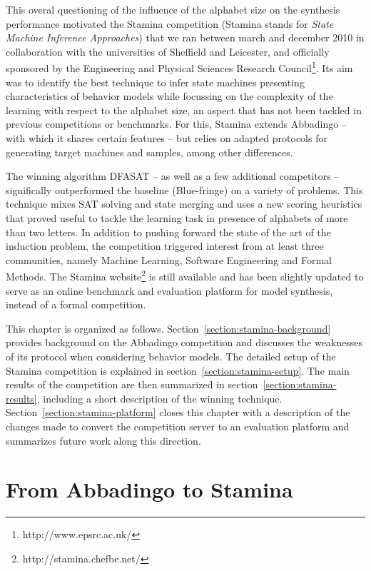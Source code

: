 This overal questioning of the influence of the alphabet size on the synthesis performance motivated the Stamina competition (Stamina stands for \emph{State Machine Inference Approaches}) that we ran between march and december 2010 in collaboration with the universities of Sheffield and Leicester, and officially sponsored by the Engineering and Physical Sciences Research Council\footnote{http://www.epsrc.ac.uk/}. Its aim was to identify the best technique to infer state machines presenting characteristics of behavior models while focussing on the complexity of the learning with respect to the alphabet size, an aspect that has not been tackled in previous competitions or benchmarks. For this, Stamina extends Abbadingo -- with which it shares certain features -- but relies on adapted protocols for generating target machines and samples, among other differences. 

The winning algorithm DFASAT -- as well as a few additional competitors -- significally outperformed the baseline (Blue-fringe) on a variety of problems. This technique mixes SAT solving and state merging and uses a new scoring heuristics that proved useful to tackle the learning task in presence of alphabets of more than two letters. In addition to pushing forward the state of the art of the induction problem, the competition triggered interest from at least three communities, namely Machine Learning, Software Engineering and Formal Methods. The Stamina website\footnote{http://stamina.chefbe.net/} is still available and has been slightly updated to serve as an online benchmark and evaluation platform for model synthesis, instead of a formal competition.

This chapter is organized as follows. Section~\ref{section:stamina-background} provides background on the Abbadingo competition and discusses the weaknesses of its protocol when considering behavior models. The detailed setup of the Stamina competition is explained in section~\ref{section:stamina-setup}. The main results of the competition are then summarized in section~\ref{section:stamina-results}, including a short description of the winning technique. Section~\ref{section:stamina-platform} closes this chapter with a description of the changes made to convert the competition server to an evaluation platform and summarizes future work along this direction.

\section{From Abbadingo to Stamina\label{section:stamina-background}}

